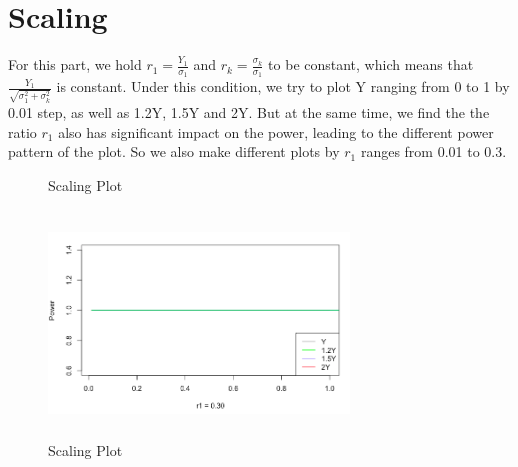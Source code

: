 \documentclass[10pt,english]{article}\usepackage{graphicx, color}
\numberwithin{equation}{section}
\numberwithin{figure}{section}
\begin{document}
\section{Scaling}
For this part, we hold $r_1=\frac{Y_1}{\sigma_1}$ and $r_k=\frac{\sigma_k}{\sigma_1}$ to be constant, which means that $\frac{Y_1}{\sqrt{\sigma_1^2+\sigma_k^2}}$ is constant. Under this condition, we try to plot Y ranging from 0 to 1 by 0.01 step, as well as 1.2Y, 1.5Y and 2Y. But at the same time, we find the the ratio $r_1$ also has significant impact on the power, leading to the different power pattern of the plot. So we also make different plots by $r_1$ ranges from 0.01 to 0.3.
\begin{figure}[htbp]
\centering{}
\caption{Scaling Plot}
\end{figure}
\begin{figure}[htbp]
\centering\includegraphics[width=8cm, height=6cm]{sca3}
\caption{\label{1}Scaling Plot}
\end{figure}
\end{document}
